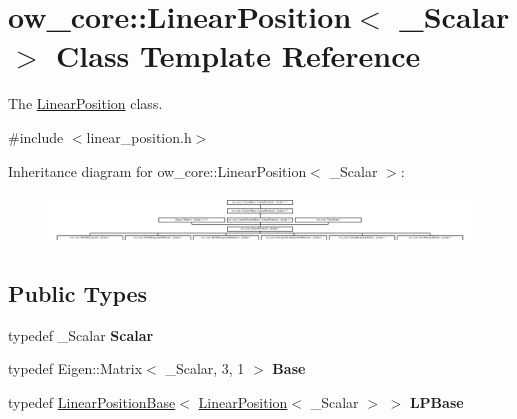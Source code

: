 \hypertarget{classow__core_1_1LinearPosition}{}\section{ow\+\_\+core\+:\+:Linear\+Position$<$ \+\_\+\+Scalar $>$ Class Template Reference}
\label{classow__core_1_1LinearPosition}


The \hyperlink{classow__core_1_1LinearPosition}{Linear\+Position} class.  




{\ttfamily \#include $<$linear\+\_\+position.\+h$>$}

Inheritance diagram for ow\+\_\+core\+:\+:Linear\+Position$<$ \+\_\+\+Scalar $>$\+:\begin{figure}[H]
\begin{center}
\leavevmode
\includegraphics[height=1.314554cm]{d1/db1/classow__core_1_1LinearPosition}
\end{center}
\end{figure}
\subsection*{Public Types}
\begin{DoxyCompactItemize}
\item 
typedef \+\_\+\+Scalar {\bfseries Scalar}\hypertarget{classow__core_1_1LinearPosition_a0102d94ddb84aaf861ce5bcbadcec713}{}\label{classow__core_1_1LinearPosition_a0102d94ddb84aaf861ce5bcbadcec713}

\item 
typedef Eigen\+::\+Matrix$<$ \+\_\+\+Scalar, 3, 1 $>$ {\bfseries Base}\hypertarget{classow__core_1_1LinearPosition_a07e70da362b7c5f13d664dc72d9feb99}{}\label{classow__core_1_1LinearPosition_a07e70da362b7c5f13d664dc72d9feb99}

\item 
typedef \hyperlink{classow__core_1_1LinearPositionBase}{Linear\+Position\+Base}$<$ \hyperlink{classow__core_1_1LinearPosition}{Linear\+Position}$<$ \+\_\+\+Scalar $>$ $>$ {\bfseries L\+P\+Base}\hypertarget{classow__core_1_1LinearPosition_adf64e84b2ed38d25cd689c6d9cfa5c94}{}\label{classow__core_1_1LinearPosition_adf64e84b2ed38d25cd689c6d9cfa5c94}

\end{DoxyCompactItemize}
